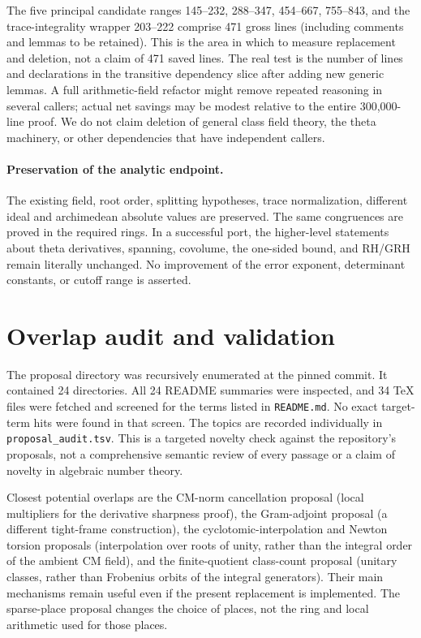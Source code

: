\documentclass[11pt]{article}
\begin{document}
The five principal candidate ranges 145--232, 288--347, 454--667, 755--843, and the trace-integrality wrapper 203--222 comprise 471 gross lines (including comments and lemmas to be retained). This is the area in which to measure replacement and deletion, not a claim of 471 saved lines. The real test is the number of lines and declarations in the transitive dependency slice after adding new generic lemmas. A full arithmetic-field refactor might remove repeated reasoning in several callers; actual net savings may be modest relative to the entire 300,000-line proof. We do not claim deletion of general class field theory, the theta machinery, or other dependencies that have independent callers.

\paragraph{Preservation of the analytic endpoint.} The existing field, root order, splitting hypotheses, trace normalization, different ideal and archimedean absolute values are preserved. The same congruences are proved in the required rings. In a successful port, the higher-level statements about theta derivatives, spanning, covolume, the one-sided bound, and RH/GRH remain literally unchanged. No improvement of the error exponent, determinant constants, or cutoff range is asserted.

\section{Overlap audit and validation}
The proposal directory was recursively enumerated at the pinned commit. It contained 24 directories. All 24 README summaries were inspected, and 34 TeX files were fetched and screened for the terms listed in \texttt{README.md}. No exact target-term hits were found in that screen. The topics are recorded individually in \texttt{proposal\_audit.tsv}. This is a targeted novelty check against the repository's proposals, not a comprehensive semantic review of every passage or a claim of novelty in algebraic number theory.

Closest potential overlaps are the CM-norm cancellation proposal (local multipliers for the derivative sharpness proof), the Gram-adjoint proposal (a different tight-frame construction), the cyclotomic-interpolation and Newton torsion proposals (interpolation over roots of unity, rather than the integral order of the ambient CM field), and the finite-quotient class-count proposal (unitary classes, rather than Frobenius orbits of the integral generators). Their main mechanisms remain useful even if the present replacement is implemented. The sparse-place proposal changes the choice of places, not the ring and local arithmetic used for those places.
\end{document}
